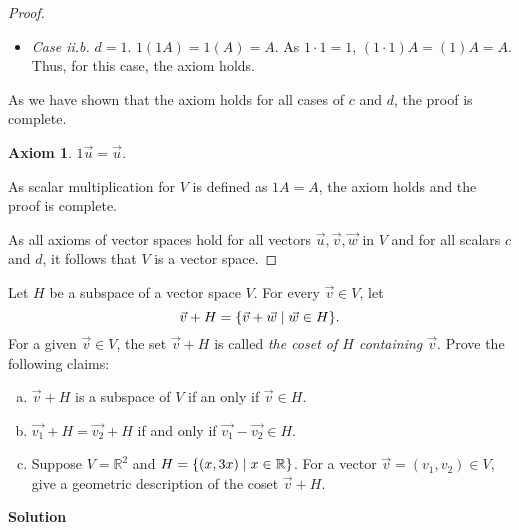 \documentclass[11pt]{scrartcl}
\theoremstyle{dotlessP}
\newtheorem{axiom}{Axiom}
\theoremstyle{dotlessN}
\DeclarePairedDelimiter\set{\{}{\}}
\newcommand{\reals}{\mathbb{R}} %
\begin{document}
\begin{proof}
\begin{subproof}
\begin{itemize}
\begin{itemize}
							\item \textit{Case ii.b.} $d = 1$. $1(1A) = 1(A) = A$. As $1 \cdot 1 = 1$, $(1 \cdot 1)A = (1)A = A$. Thus, for this case, the axiom holds.
						\end{itemize}
				\end{itemize}
				As we have shown that the axiom holds for all cases of $c$ and $d$, the proof is complete.
		\end{subproof}
		\begin{axiom}
			$1\vec{u} = \vec{u}$.
		\end{axiom}
		\begin{subproof}
			[Subproof]
			As scalar multiplication for $V$ is defined as $1A = A$, the axiom holds and the proof is complete.
		\end{subproof}
		As all axioms of vector spaces hold for all vectors $\vec{u}, \vec{v}, \vec{w}$ in $V$ and for all scalars $c$ and $d$, it follows that $V$ is a vector space.	
\end{proof}
\begin{ques}
	Let $H$ be a subspace of a vector space $V$. For every $\vec{v} \in V$, let
	\[
		\vec{v} + H = \set*{\vec{v} + \vec{w} \mid \vec{w} \in H}.
	\] 
	For a given $\vec{v} \in V$, the set $\vec{v} +  H$ is called \textit{the coset of $H$ containing $\vec{v}$}. Prove the following claims:
	\begin{enumerate}[(a)]
		\item $\vec{v} + H$ is a subspace of $V$ if an only if $\vec{v} \in H$.
		\item $\vec{v_1} + H = \vec{v_2} + H$ if and only if $\vec{v_1} - \vec{v_2} \in H$.
		\item Suppose  $V = \reals^2$ and $H = \set*{(x, 3x) \mid x \in \reals}$. For a vector  $\vec{v} = (v_1,v_2) \in V$, give a geometric description of the coset $\vec{v} + H$.
	\end{enumerate} 
\end{ques}
\textbf{Solution}
\end{document}
